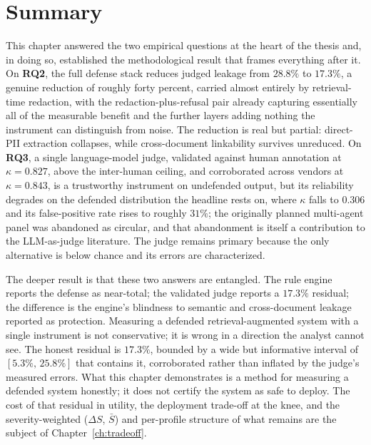 \section{Summary}
\label{sec:ch5-summary}

This chapter answered the two empirical questions at the heart of the thesis and, in doing
so, established the methodological result that frames everything after it. On \textbf{RQ2},
the full defense stack reduces judged leakage from $28.8\%$ to $17.3\%$, a genuine reduction
of roughly forty percent, carried almost entirely by retrieval-time redaction, with the
redaction-plus-refusal pair already capturing essentially all of the measurable benefit and
the further layers adding nothing the instrument can distinguish from noise. The reduction is
real but partial: direct-PII extraction collapses, while cross-document linkability survives
unreduced. On \textbf{RQ3}, a single language-model judge, validated against human annotation
at $\kappa = 0.827$, above the inter-human ceiling, and corroborated across vendors at
$\kappa = 0.843$, is a trustworthy instrument on undefended output, but its reliability
degrades on the defended distribution the headline rests on, where $\kappa$ falls to $0.306$
and its false-positive rate rises to roughly $31\%$; the originally planned multi-agent panel
was abandoned as circular, and that abandonment is itself a contribution to the LLM-as-judge
literature. The judge remains primary because the only alternative is below chance and its
errors are characterized.

The deeper result is that these two answers are entangled. The rule engine reports the
defense as near-total; the validated judge reports a $17.3\%$ residual; the difference is the
engine's blindness to semantic and cross-document leakage reported as protection. Measuring a
defended retrieval-augmented system with a single instrument is not conservative; it is
wrong in a direction the analyst cannot see. The honest residual is $17.3\%$, bounded by a
wide but informative interval of $[5.3\%,\,25.8\%]$ that contains it, corroborated rather than
inflated by the judge's measured errors. What this chapter demonstrates is a method for
measuring a defended system honestly; it does not certify the system as safe to deploy. The
cost of that residual in utility, the deployment trade-off at the knee, and the
severity-weighted ($\Delta S$, $\bar{S}$) and per-profile structure of what remains are the
subject of Chapter~\ref{ch:tradeoff}.


